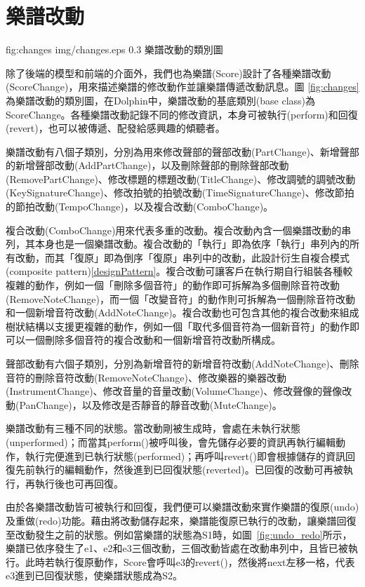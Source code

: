 \documentclass[12pt,a4paper,oneside]{report}
\begin{document}
\section{樂譜改動} %
\label{sec:changes}

\figurewithcaption
{fig:changes}
{img/changes.eps}
{0.3}
{樂譜改動的類別圖}

除了後端的模型和前端的介面外，我們也為樂譜(Score)設計了各種樂譜改動(ScoreChange)，用來描述樂譜的修改動作並讓樂譜傳遞改動訊息。圖 \ref{fig:changes}為樂譜改動的類別圖，在Dolphin中，樂譜改動的基底類別(base class)為ScoreChange。各種樂譜改動記錄不同的修改資訊，本身可被執行(perform)和回復(revert)，也可以被傳遞、配發給感興趣的傾聽者。

樂譜改動有八個子類別，分別為用來修改聲部的聲部改動(PartChange)、新增聲部的新增聲部改動(AddPartChange)，以及刪除聲部的刪除聲部改動(RemovePartChange)、修改標題的標題改動(TitleChange)、修改調號的調號改動(KeySignatureChange)、修改拍號的拍號改動(TimeSignatureChange)、修改節拍的節拍改動(TempoChange)，以及複合改動(ComboChange)。

複合改動(ComboChange)用來代表多重的改動。複合改動內含一個樂譜改動的串列，其本身也是一個樂譜改動。複合改動的「執行」即為依序「執行」串列內的所有改動，而其「復原」即為倒序「復原」串列中的改動，此設計衍生自複合模式(composite pattern)\ref{designPattern}。複合改動可讓客戶在執行期自行組裝各種較複雜的動作，例如一個「刪除多個音符」的動作即可拆解為多個刪除音符改動(RemoveNoteChange)，而一個「改變音符」的動作則可拆解為一個刪除音符改動和一個新增音符改動(AddNoteChange)。複合改動也可包含其他的複合改動來組成樹狀結構以支援更複雜的動作，例如一個「取代多個音符為一個新音符」的動作即可以一個刪除多個音符的複合改動和一個新增音符改動所構成。

聲部改動有六個子類別，分別為新增音符的新增音符改動(AddNoteChange)、刪除音符的刪除音符改動(RemoveNoteChange)、修改樂器的樂器改動(InstrumentChange)、修改音量的音量改動(VolumeChange)、修改聲像的聲像改動(PanChange)，以及修改是否靜音的靜音改動(MuteChange)。

樂譜改動有三種不同的狀態。當改動剛被生成時，會處在未執行狀態(unperformed)；而當其perform()被呼叫後，會先儲存必要的資訊再執行編輯動作，執行完便進到已執行狀態(performed)；再呼叫revert()即會根據儲存的資訊回復先前執行的編輯動作，然後進到已回復狀態(reverted)。已回復的改動可再被執行，再執行後也可再回復。

由於各樂譜改動皆可被執行和回復，我們便可以樂譜改動來實作樂譜的復原(undo)及重做(redo)功能。藉由將改動儲存起來，樂譜能復原已執行的改動，讓樂譜回復至改動發生之前的狀態。例如當樂譜的狀態為S1時，如圖~\ref{fig:undo_redo}所示，樂譜已依序發生了e1、e2和e3三個改動，三個改動皆處在改動串列中，且皆已被執行。此時若執行復原動作，Score會呼叫e3的revert()，然後將next左移一格，代表e3進到已回復狀態，使樂譜狀態成為S2。
\end{document}
